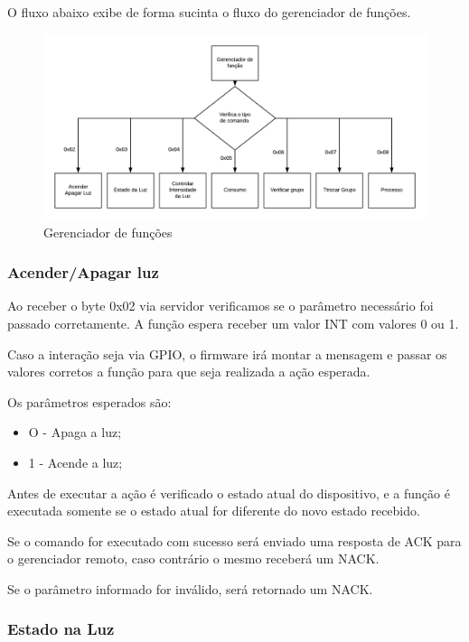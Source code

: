 \documentclass[openright]{normas-utf-tex} %
\begin{document}
O fluxo abaixo exibe de forma sucinta o fluxo do gerenciador de funções.

\begin{figure}[!htb]
     \centering
     \includegraphics[scale=0.7]{3_flux.png}
     \caption{Gerenciador de funções}
     \label{}
\end{figure}


\subsubsection{Acender/Apagar luz}

Ao receber o byte 0x02 via servidor verificamos se o parâmetro necessário foi passado corretamente. A função espera receber um valor INT com valores 0 ou 1.

Caso a interação seja via GPIO, o firmware irá montar a mensagem e passar os valores corretos a função para que seja realizada a ação esperada.

Os parâmetros esperados são:
\begin{itemize}
    \item O - Apaga a luz;
    \item 1 - Acende a luz;
\end{itemize}

Antes de executar a ação é verificado o estado atual do dispositivo, e a função é executada somente se o estado atual for diferente do novo estado recebido.

Se o comando for executado com sucesso será enviado uma resposta de ACK para o gerenciador remoto, caso contrário o mesmo receberá um NACK.

Se o parâmetro informado for inválido, será retornado um NACK.

\subsubsection{Estado na Luz}
\end{document}
